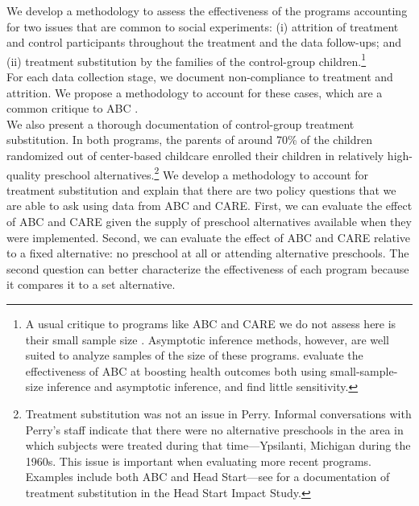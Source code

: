 \noindent We develop a methodology to assess the effectiveness of the programs accounting for two issues that are common to social experiments: (i) attrition of treatment and control participants throughout the treatment and the data follow-ups; and (ii) treatment substitution by the families of the control-group children.\footnote{A usual critique to programs like ABC and CARE we do not assess here is their small sample size \citep{Hanushek_Lindseth_2009_BOOKSchoolhousesCourthouses}. Asymptotic inference methods, however, are well suited to analyze samples of the size of these programs. \citet{Campbell_Conti_etal_2014_EarlyChildhoodInvestments} evaluate the effectiveness of ABC at boosting health outcomes both using small-sample-size inference and asymptotic inference, and find little sensitivity.}\\

\noindent For each data collection stage, we document non-compliance to treatment and attrition. We propose a methodology to account for these cases, which are a common critique to ABC \citep{Spitz_1992_ABC-Retardation,Hu_2014_ABC-Study}.\\

\noindent We also present a thorough documentation of control-group treatment substitution. In both programs, the parents of around 70\% of the children randomized out of center-based childcare enrolled their children in relatively high-quality preschool alternatives.\footnote{Treatment substitution was not an issue in Perry. Informal conversations with Perry's staff indicate that there were no alternative preschools in the area in which subjects were treated during that time---Ypsilanti, Michigan during the 1960s. This issue is important when evaluating more recent programs. Examples include both ABC and Head Start---see \citep{Puma_Bell_etal_2010_HeadStartImpact} for a documentation of treatment substitution in the Head Start Impact Study.} We develop a methodology to account for treatment substitution and explain that there are two policy questions that we are able to ask using data from ABC and CARE. First, we can evaluate the effect of ABC and CARE given the supply of preschool alternatives available when they were implemented. Second, we can evaluate the effect of ABC and CARE relative to a fixed alternative: no preschool at all or attending alternative preschools. The second question can better characterize the effectiveness of each program because it compares it to a set alternative.\\

